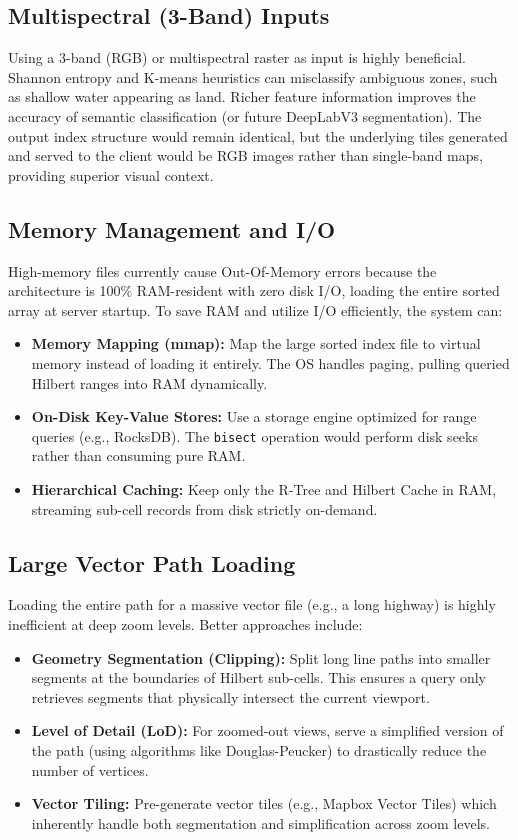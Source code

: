 \documentclass[conference]{IEEEtran}
\begin{document}
\subsection{Multispectral (3-Band) Inputs}
Using a 3-band (RGB) or multispectral raster as input is highly beneficial. Shannon entropy and K-means heuristics can misclassify ambiguous zones, such as shallow water appearing as land. Richer feature information improves the accuracy of semantic classification (or future DeepLabV3 segmentation). The output index structure would remain identical, but the underlying tiles generated and served to the client would be RGB images rather than single-band maps, providing superior visual context.

\subsection{Memory Management and I/O}
High-memory files currently cause Out-Of-Memory errors because the architecture is 100\% RAM-resident with zero disk I/O, loading the entire sorted array at server startup. To save RAM and utilize I/O efficiently, the system can:
\begin{itemize}
  \item \textbf{Memory Mapping (mmap):} Map the large sorted index file to virtual memory instead of loading it entirely. The OS handles paging, pulling queried Hilbert ranges into RAM dynamically.
  \item \textbf{On-Disk Key-Value Stores:} Use a storage engine optimized for range queries (e.g., RocksDB). The \texttt{bisect} operation would perform disk seeks rather than consuming pure RAM.
  \item \textbf{Hierarchical Caching:} Keep only the R-Tree and Hilbert Cache in RAM, streaming sub-cell records from disk strictly on-demand.
\end{itemize}

\subsection{Large Vector Path Loading}
Loading the entire path for a massive vector file (e.g., a long highway) is highly inefficient at deep zoom levels. Better approaches include:
\begin{itemize}
  \item \textbf{Geometry Segmentation (Clipping):} Split long line paths into smaller segments at the boundaries of Hilbert sub-cells. This ensures a query only retrieves segments that physically intersect the current viewport.
  \item \textbf{Level of Detail (LoD):} For zoomed-out views, serve a simplified version of the path (using algorithms like Douglas-Peucker) to drastically reduce the number of vertices.
  \item \textbf{Vector Tiling:} Pre-generate vector tiles (e.g., Mapbox Vector Tiles) which inherently handle both segmentation and simplification across zoom levels.
\end{itemize}
\end{document}
